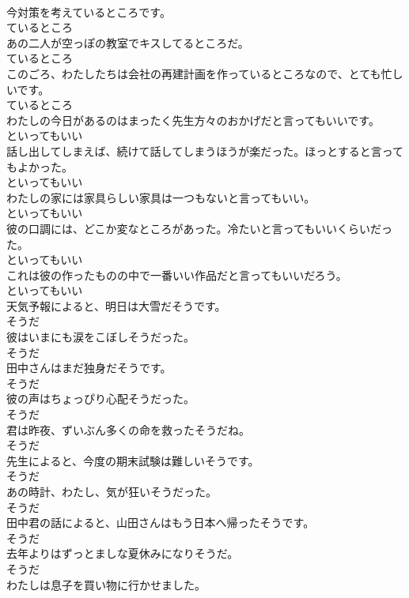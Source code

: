 \documentclass[8pt]{extreport}
\begin{document}
\begin{CJK}{UTF8}{min}
\\	今対策を考えているところです。	
\\	ているところ
\\	あの二人が空っぽの教室でキスしてるところだ。	
\\	ているところ
\\	このごろ、わたしたちは会社の再建計画を作っているところなので、とても忙しいです。	
\\	ているところ
\\	わたしの今日があるのはまったく先生方々のおかげだと言ってもいいです。	
\\	といってもいい
\\	話し出してしまえば、続けて話してしまうほうが楽だった。ほっとすると言ってもよかった。	
\\	といってもいい
\\	わたしの家には家具らしい家具は一つもないと言ってもいい。	
\\	といってもいい
\\	彼の口調には、どこか変なところがあった。冷たいと言ってもいいくらいだった。	
\\	といってもいい
\\	これは彼の作ったものの中で一番いい作品だと言ってもいいだろう。	
\\	といってもいい
\\	天気予報によると、明日は大雪だそうです。	
\\	そうだ
\\	彼はいまにも涙をこぼしそうだった。	
\\	そうだ
\\	田中さんはまだ独身だそうです。	
\\	そうだ
\\	彼の声はちょっぴり心配そうだった。	
\\	そうだ
\\	君は昨夜、ずいぶん多くの命を救ったそうだね。	
\\	そうだ
\\	先生によると、今度の期末試験は難しいそうです。	
\\	そうだ
\\	あの時計、わたし、気が狂いそうだった。	
\\	そうだ
\\	田中君の話によると、山田さんはもう日本へ帰ったそうです。	
\\	そうだ
\\	去年よりはずっとましな夏休みになりそうだ。	
\\	そうだ
\\	わたしは息子を買い物に行かせました。	

\end{CJK}
\end{document}
